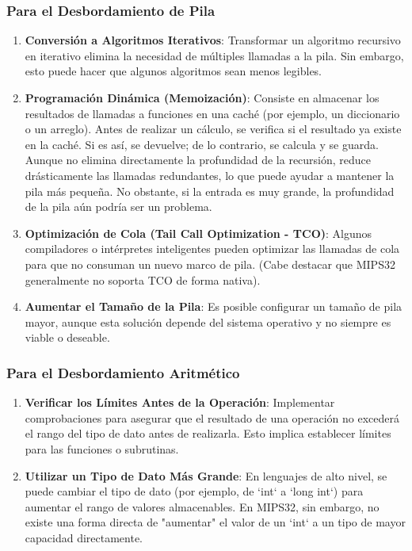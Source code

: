 \documentclass{article}
\begin{document}
\subsubsection*{Para el Desbordamiento de Pila}
\begin{enumerate}
    \item \textbf{Conversión a Algoritmos Iterativos}: Transformar un algoritmo recursivo en iterativo elimina la necesidad de múltiples llamadas a la pila. Sin embargo, esto puede hacer que algunos algoritmos sean menos legibles.
    \item \textbf{Programación Dinámica (Memoización)}: Consiste en almacenar los resultados de llamadas a funciones en una caché (por ejemplo, un diccionario o un arreglo). Antes de realizar un cálculo, se verifica si el resultado ya existe en la caché. Si es así, se devuelve; de lo contrario, se calcula y se guarda. Aunque no elimina directamente la profundidad de la recursión, reduce drásticamente las llamadas redundantes, lo que puede ayudar a mantener la pila más pequeña. No obstante, si la entrada es muy grande, la profundidad de la pila aún podría ser un problema.
    \item \textbf{Optimización de Cola (Tail Call Optimization - TCO)}: Algunos compiladores o intérpretes inteligentes pueden optimizar las llamadas de cola para que no consuman un nuevo marco de pila. (Cabe destacar que MIPS32 generalmente no soporta TCO de forma nativa).
    \item \textbf{Aumentar el Tamaño de la Pila}: Es posible configurar un tamaño de pila mayor, aunque esta solución depende del sistema operativo y no siempre es viable o deseable.
\end{enumerate}

\subsubsection*{Para el Desbordamiento Aritmético}
\begin{enumerate}
    \item \textbf{Verificar los Límites Antes de la Operación}: Implementar comprobaciones para asegurar que el resultado de una operación no excederá el rango del tipo de dato antes de realizarla. Esto implica establecer límites para las funciones o subrutinas.
    \item \textbf{Utilizar un Tipo de Dato Más Grande}: En lenguajes de alto nivel, se puede cambiar el tipo de dato (por ejemplo, de `int` a `long int`) para aumentar el rango de valores almacenables. En MIPS32, sin embargo, no existe una forma directa de "aumentar" el valor de un `int` a un tipo de mayor capacidad directamente.
\end{enumerate}
\end{document}
